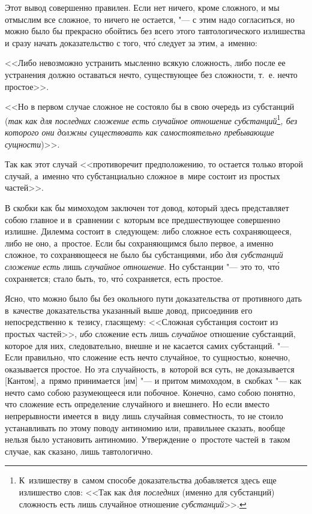 Этот вывод совершенно правилен. Если нет ничего, кроме сложного, и мы
отмыслим все сложное, то ничего не остается, "--- с этим надо согласиться, но
можно было бы прекрасно обойтись без всего этого тавтологического излишества
и сразу начать доказательство с того, чт\'{о} следует за этим, а~именно:

<<Либо невозможно устранить мысленно всякую сложность, либо после ее устранения
должно оставаться нечто, существующее без сложности, т.~е. нечто простое>>.

<<Но в первом случае сложное не состояло бы в свою очередь из субстанций
({\em так как для последних сложение есть случайное
отношение субстанций}\footnote{К~излишеству в~самом способе
доказательства добавляется здесь еще излишество слов: <<Так как
{\em для последних} (именно для субстанций) сложность есть лишь случайное
отношение {\em субстанций}>>.}{\em , без которого они должны
существовать как самостоятельно пребывающие сущности})>>.

Так как этот случай <<противоречит предположению, то остается
только второй случай, а~именно что субстанциально
сложное в~мире состоит из простых частей>>.

В скобки как бы мимоходом заключен тот довод, который здесь представляет
собою главное и в~сравнении с~которым все предшествующее совершенно излишне.
Дилемма состоит в~следующем: либо сложное есть сохраняющееся, либо не оно,
а~простое. Если бы сохраняющимся было первое, а именно сложное,
то сохраняющееся не было бы субстанциями, ибо {\em для субстанций
сложение есть} лишь {\em случайное отношение}. Но субстанции "--- это то,
чт\'{о} сохраняется; стало быть, то, чт\'{о} сохраняется, есть простое.

Ясно, что можно было бы без окольного пути доказательства от противного дать
в~качестве доказательства указанный выше довод, присоединив его
непосредственно к~тезису, гласящему: <<Сложная субстанция состоит из простых
частей>>, {\em ибо} сложение есть лишь {\em случайное} отношение субстанций,
которое для них, следовательно, внешне и не касается самих субстанций. "---
Если правильно, что сложение есть нечто случайное, то сущностью, конечно,
оказывается простое. Но эта случайность, в~которой вся суть, не доказывается
[Кантом], а~прямо принимается [им] "--- и притом мимоходом, в~скобках "--- как
нечто само собою разумеющееся или побочное. Конечно, само собою понятно, что
сложение есть определение случайного и внешнего. Но если вместо непрерывности
имеется в~виду лишь случайная совместность, то не стоило устанавливать
по этому поводу антиномию или, правильнее сказать, вообще нельзя было
установить антиномию. Утверждение о~простоте частей в~таком случае,
как сказано, лишь тавтологично.


